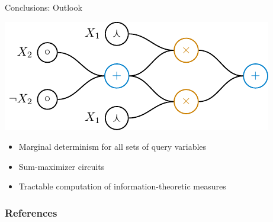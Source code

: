\documentclass[aspectratio=169]{beamer}
\begin{document}
  \begin{frame}{Conclusions: Outlook}
    \vspace{1em}
    \onslide<+->
    \begin{minipage}[c]{0.49\textwidth}
      \center
      \includegraphics[width=\textwidth]{figures/example.pdf}
    \end{minipage}
    \begin{minipage}[c]{0.49\textwidth}
      \begin{itemize}
        \item<+-> Marginal determinism for all sets of query variables
        \item<+-> Sum-maximizer circuits
        \item<+-> Tractable computation of information-theoretic measures
      \end{itemize}
    \end{minipage}
  \end{frame}

\setcounter{backupcounter}{\value{framenumber}}

\begin{frame}[plain]
  \frametitle{References}
    \nocite{*}
    \printbibliography
\end{frame}

\setcounter{framenumber}{\value{backupcounter}}
\end{document}
